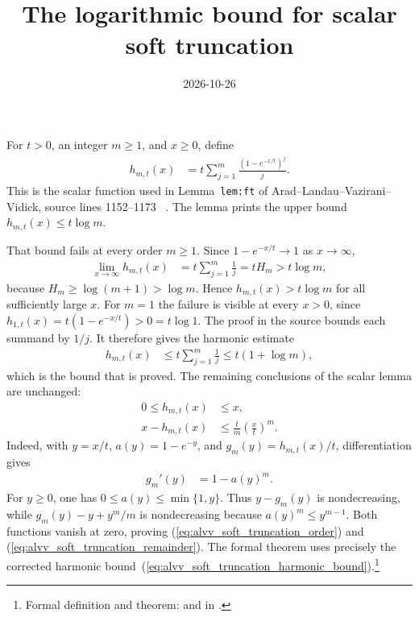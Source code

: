 \documentclass{article}
\title{The logarithmic bound for scalar soft truncation}
\author{}
\date{2026-10-26}
\begin{document}
\maketitle
{}

For $t>0$, an integer $m\geq1$, and $x\geq0$, define
\begin{align}
    h_{m,t}(x)
        &=t\sum_{j=1}^{m}\frac{{(1-e^{-x/t})}^{j}}{j}.
    \label{eq:alvv_soft_truncation_definition}
\end{align}
This is the scalar function used in Lemma~\texttt{lem:ft} of
Arad--Landau--Vazirani--Vidick, source lines 1152--1173
~\cite{Arad2016RigorousRG}. The lemma prints the upper bound
$h_{m,t}(x)\leq t\log m$.

That bound fails at every order $m\geq1$. Since $1-e^{-x/t}\to1$ as
$x\to\infty$,
\begin{align}
    \lim_{x\to\infty}h_{m,t}(x)
        &=t\sum_{j=1}^{m}\frac1j
         =tH_m
         >t\log m,
    \label{eq:alvv_soft_truncation_counterexample}
\end{align}
because $H_m\geq\log(m+1)>\log m$. Hence $h_{m,t}(x)>t\log m$ for all
sufficiently large $x$. For $m=1$ the failure is visible at every $x>0$,
since $h_{1,t}(x)=t(1-e^{-x/t})>0=t\log1$.
The proof in the source bounds each summand by $1/j$. It therefore gives the
harmonic estimate
\begin{align}
    h_{m,t}(x)
        &\leq t\sum_{j=1}^{m}\frac1j
         \leq t(1+\log m),
    \label{eq:alvv_soft_truncation_harmonic_bound}
\end{align}
which is the bound that is proved. The remaining conclusions of the scalar lemma
are unchanged:
\begin{align}
    0\leq h_{m,t}(x)&\leq x,
    \label{eq:alvv_soft_truncation_order}\\
    x-h_{m,t}(x)&\leq \frac{t}{m}{\left(\frac{x}{t}\right)}^{m}.
    \label{eq:alvv_soft_truncation_remainder}
\end{align}
Indeed, with $y=x/t$, $a(y)=1-e^{-y}$, and
$g_m(y)=h_{m,t}(x)/t$, differentiation gives
\begin{align}
    g_m'(y)&=1-{a(y)}^{m}.
    \label{eq:alvv_soft_truncation_derivative}
\end{align}
For $y\geq0$, one has $0\leq a(y)\leq\min\{1,y\}$. Thus
$y-g_m(y)$ is nondecreasing, while
$g_m(y)-y+y^m/m$ is nondecreasing because
${a(y)}^{m}\leq y^{m-1}$. Both functions vanish at zero, proving
(\ref{eq:alvv_soft_truncation_order}) and
(\ref{eq:alvv_soft_truncation_remainder}). The formal theorem uses precisely
the corrected harmonic bound~(\ref{eq:alvv_soft_truncation_harmonic_bound}).\footnote{Formal definition and theorem:
 and  in
.}



\end{document}
